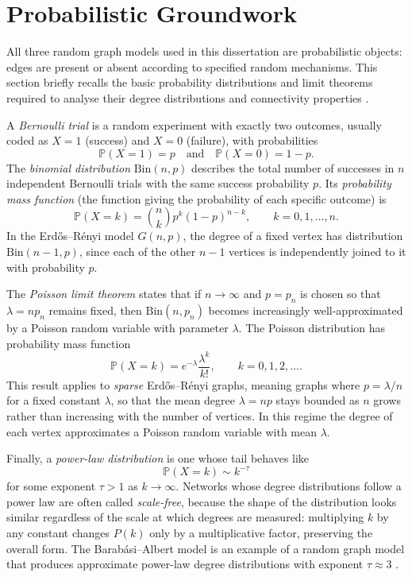 \documentclass[12pt, a4paper]{report}
\theoremstyle{definition}
\theoremstyle{plain}
\theoremstyle{remark}
\begin{document}
\section{Probabilistic Groundwork}
\label{sec:probability}

All three random graph models used in this dissertation are 
probabilistic objects: edges are present or absent according to 
specified random mechanisms. This section briefly recalls the 
basic probability distributions and limit theorems required to 
analyse their degree distributions and connectivity properties
\cite{hofstad2017, bollobas2001}.

A \emph{Bernoulli trial} is a random experiment with exactly two
outcomes, usually coded as $X = 1$ (success) and $X = 0$
(failure), with probabilities
\[
  \mathbb{P}(X = 1) = p
  \quad\text{and}\quad
  \mathbb{P}(X = 0) = 1 - p.
\]
The \emph{binomial distribution} $\mathrm{Bin}(n,p)$ describes 
the total number of successes in $n$ independent Bernoulli
trials with the same success probability $p$. Its
\emph{probability mass function} (the function giving the
probability of each specific outcome) is
\[
  \mathbb{P}(X = k)
  = \binom{n}{k} p^k (1-p)^{n-k},
  \qquad k = 0,1,\dots,n.
\]
In the Erd\H{o}s--R\'enyi model $G(n,p)$, the degree of a fixed 
vertex has distribution $\mathrm{Bin}(n-1,p)$, since each of the 
other $n-1$ vertices is independently joined to it with 
probability $p$.

The \emph{Poisson limit theorem} states that if $n \to \infty$ 
and $p = p_n$ is chosen so that $\lambda = np_n$ remains
fixed, then $\mathrm{Bin}(n,p_n)$ becomes increasingly
well-approximated by a Poisson random variable with parameter
$\lambda$. The Poisson 
distribution has probability mass function
\[
  \mathbb{P}(X = k)
  = e^{-\lambda} \frac{\lambda^k}{k!},
  \qquad k = 0,1,2,\dots.
\]
This result applies to \emph{sparse} Erd\H{o}s--R\'enyi graphs,
meaning graphs where $p = \lambda/n$ for a fixed constant
$\lambda$, so that the mean degree $\lambda = np$ stays bounded
as $n$ grows rather than increasing with the number of vertices.
In this regime the degree of each vertex approximates a
Poisson random variable with mean $\lambda$.

Finally, a \emph{power-law distribution} is one whose tail
behaves like
\[
  \mathbb{P}(X = k) \sim k^{-\tau}
\]
for some exponent $\tau > 1$ as $k \to \infty$. Networks whose 
degree distributions follow a power law are often called
\emph{scale-free}, because the shape of the distribution looks
similar regardless of the scale at which degrees are measured:
multiplying $k$ by any constant changes $P(k)$ only by a
multiplicative factor, preserving the overall form. The
Barab\'asi--Albert model is an example of a random graph model
that produces approximate power-law degree distributions with
exponent $\tau \approx 3$ \cite{albert2002}.
\end{document}

